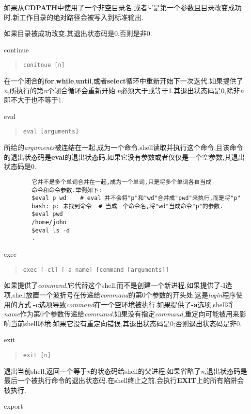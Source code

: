 \documentclass[draft,openany]{book}
\begin{document}
\begin{CJK}{UTF8}{gbsn}
\begin{basedescript}{\desclabelstyle{\nextlinelabel}\desclabelwidth{2.5em}}
        如果从\textbf{CDPATH}中使用了一个非空目录名,或者`-'是第一个参数且目录改变成功时,新工作目录的绝对路径会被写入到标准输出.\par
        如果目录被成功改变,其退出状态码是0,否则是非0.
    \item[continue]
        \begin{quote}
            \verb+conitnue [n]+
        \end{quote}
        在一个闭合的\textbf{for},\textbf{while},\textbf{until},或者\textbf{select}循环中重新开始下一次迭代.如果提供了\emph{n},所执行的第\emph{n}个闭合循环会重新开始.\emph{n}必须大于或等于1.其退出状态码是0,除非\emph{n}即不大于也不等于1.
    \item[eval]
        \begin{quote}
            \verb+eval [arguments]+
        \end{quote}
        所给的\emph{arguments}被连结在一起,成为一个命令,shell读取并执行这个命令,且该命令的退出状态码是\textbf{eval}的退出状态码.如果它没有参数或者仅仅是一个空参数,其退出状态码是0.
        \begin{verbatim}
        它并不是多个单词合并在一起,成为一个单词,只是将多个单词各自当成
        命令和命令参数.举例如下:
        $eval p wd    # eval 并不会将"p"和"wd"合并成"pwd"来执行,而是将"p"
        bash: p: 未找到命令  # 当成一个命令名,将"wd"当成命令"p"的参数.
        $eval pwd
        /home/john
        $eval ls -d
        .
        \end{verbatim}
    \item[exec]
        \begin{quote}
            \verb+exec [-cl] [-a name] [command [arguments]]+
        \end{quote}
        如果提供了\emph{command},它代替这个shell,而不是创建一个新进程.如果提供了\textbf{-l}选项,shell放置一个波折号在传递给\emph{command}的第0个参数的开头处.这是\emph{login}程序使用的方式.\textbf{-c}选项导致\emph{command}在一个空环境被执行.如果提供了\textbf{-a}选项,shell将\emph{name}作为第0个参数传递给\emph{command}.如果没有指定\emph{command},重定向可能被用来影响当前shell环境.如果它没有重定向错误,其退出状态码是0;否则退出状态码是非0.
    \item[exit]
        \begin{quote}
            \verb+exit [n]+
        \end{quote}
        退出当前shell,返回一个等于\emph{n}的状态码给shell的父进程.如果省略了\emph{n},退出状态码是最后一个被执行命令的退出状态码.在shell终止之前,会执行\textbf{EXIT}上的所有陷阱会被执行.
    \item[export]

\end{basedescript}
\end{CJK}
\end{document}
